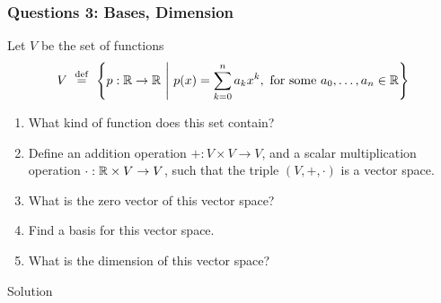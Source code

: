 \documentclass{beamer}
\begin{document}
\begin{frame}
	\frametitle{Questions 3: Bases, Dimension}
	Let $V$ be the set of functions \\
	$$V \ \overset{\rm def}{=} \ \left\{ p: \mathbb{R} \to \mathbb{R}\ \middle| \ p(x) = \sum_{k=0}^n a_k x^k, \text{ for some } a_0,\dots,a_n \in \mathbb{R} \right\}$$
	\smallskip
	\begin{enumerate}
		\item What kind of function does this set contain?
		\item Define an addition operation $+: V\times V \to V$,
			and a scalar multiplication operation $\cdot: \mathbb{R} \times V \to V$,
			such that the triple $(V,+,\cdot)$ is a vector space.
		\item What is the zero vector of this vector space?
		\item Find a basis for this vector space.
		\item What is the dimension of this vector space?
	\end{enumerate}
\end{frame}
\begin{frame}[t]{Solution}
	\grid
	\pause
	\pause
	\pause
\end{frame}
\end{document}
